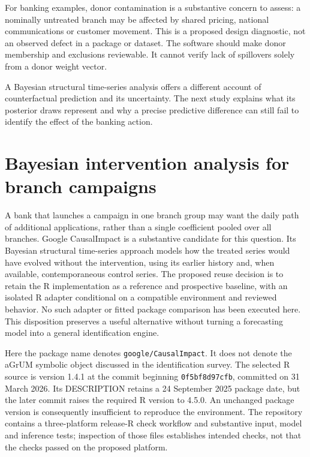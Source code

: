 For banking examples, donor contamination is a substantive concern to assess:
a nominally untreated branch may be affected by shared pricing, national
communications or customer movement. This is a proposed design diagnostic,
not an observed defect in a package or dataset. The software should make donor
membership and exclusions reviewable. It cannot verify lack of spillovers
solely from a donor weight vector.

A Bayesian structural time-series analysis offers a different account of
counterfactual prediction and its uncertainty. The next study explains what
its posterior draws represent and why a precise predictive difference can
still fail to identify the effect of the banking action.



\section{Bayesian intervention analysis for branch campaigns}
\label{exec13:causalimpact-reuse}

A bank that launches a campaign in one branch group may want the daily path of
additional applications, rather than a single coefficient pooled over all
branches. Google CausalImpact is a substantive candidate for this question.
Its Bayesian structural time-series approach models how the treated series
would have evolved without the intervention, using its earlier history and,
when available, contemporaneous control series. The proposed reuse decision
is to retain the R implementation as a reference and prospective baseline,
with an isolated R adapter conditional on a compatible environment and
reviewed behavior. No such adapter or fitted package comparison has been
executed here. This disposition preserves a useful alternative without
turning a forecasting model into a general identification engine.
\cite{exec13_ci_reuse,exec13_ci_r}

Here the package name denotes \texttt{google/CausalImpact}. It does not denote
the aGrUM symbolic object discussed in the identification survey. The
selected R source is version 1.4.1 at the commit beginning
\texttt{0f5bf8d97cfb}, committed on 31 March 2026. Its DESCRIPTION retains a
24 September 2025 package date, but the later commit raises the required R
version to 4.5.0. An unchanged package version is consequently insufficient
to reproduce the environment. The repository contains a three-platform
release-R check workflow and substantive input, model and inference tests;
inspection of those files establishes intended checks, not that the checks
passed on the proposed platform. \cite{exec13_ci_r,exec13_ci_semantics}

